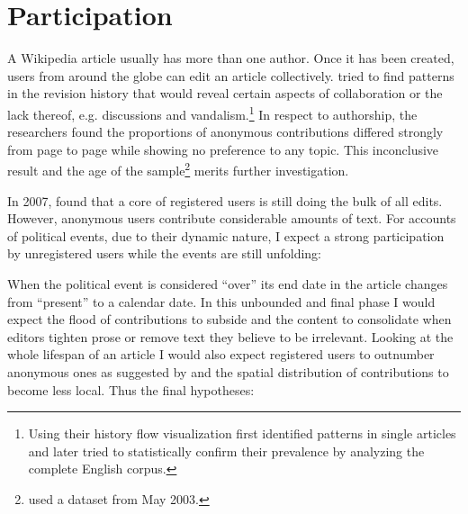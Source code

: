 \section{Participation}\label{sec:participation}

A Wikipedia article usually has more than one author.
Once it has been created, users from around the globe can edit an article collectively.
\textcite{viegas2004history} tried to find patterns in the revision history that would reveal certain aspects of collaboration or the lack thereof, e.g. discussions and vandalism.\footnote{Using their history flow visualization \textcite{viegas2004history} first identified patterns in single articles and later tried to statistically confirm their prevalence by analyzing the complete English corpus.} 
In respect to authorship, the researchers found the proportions of anonymous contributions differed strongly from page to page while showing no preference to any topic.
This inconclusive result and the age of the sample\footnote{\textcite{viegas2004history} used a dataset from May 2003.} merits further investigation. 

In 2007, \textcite{kittur2007power} found that a core of registered users is still doing the bulk of all edits.
However, anonymous users contribute considerable amounts of text. 
For accounts of political events, due to their dynamic nature, I expect a strong participation by unregistered users while the events are still unfolding:



When the political event is considered ``over'' its end date in the article changes from ``present'' to a calendar date.
In this unbounded and final phase I would expect the flood of contributions to subside and the content to consolidate when editors tighten prose or remove text they believe to be irrelevant.
Looking at the whole lifespan of an article I would also expect registered users to outnumber anonymous ones as suggested by \textcite{kittur2007power} and the spatial distribution of contributions to become less local.
Thus the final hypotheses:



